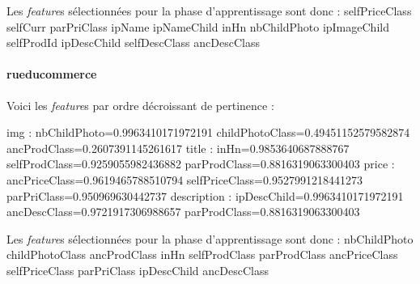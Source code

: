 \documentclass{article}
\begin{document}
Les \emph{feature}s sélectionnées pour la phase d'apprentissage sont donc :
selfPriceClass selfCurr parPriClass ipName ipNameChild inHn nbChildPhoto ipImageChild selfProdId ipDescChild selfDescClass ancDescClass

\paragraph{rueducommerce}
Voici les \emph{feature}s par ordre décroissant de pertinence :
\begin{itemize}
img : nbChildPhoto=0.9963410171972191 childPhotoClass=0.49451152579582874 ancProdClass=0.2607391145261617
title : inHn=0.9853640687888767 selfProdClass=0.9259055982436882 parProdClass=0.8816319063300403
price : ancPriceClass=0.9619465788510794 selfPriceClass=0.9527991218441273 parPriClass=0.950969630442737
description : ipDescChild=0.9963410171972191 ancDescClass=0.9721917306988657 parProdClass=0.8816319063300403
\end{itemize}

Les \emph{feature}s sélectionnées pour la phase d'apprentissage sont donc :
nbChildPhoto childPhotoClass ancProdClass inHn selfProdClass parProdClass ancPriceClass selfPriceClass parPriClass ipDescChild ancDescClass
\end{document}
